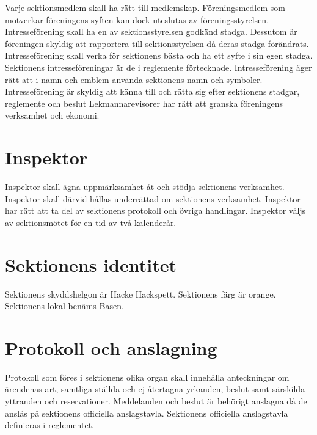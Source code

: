 \documentclass[a4paper]{dteklag}
\begin{document}
\para Varje sektionsmedlem skall ha rätt till medlemskap. Föreningsmedlem som motverkar föreningens syften kan dock uteslutas av föreningsstyrelsen.
\para Intresseförening skall ha en av sektionsstyrelsen godkänd stadga. Dessutom är föreningen skyldig att rapportera till sektionsstyelsen då deras stadga förändrats.
\para Intresseförening skall verka för sektionens bästa och ha ett syfte i sin egen stadga.
\para Sektionens intresseföreningar är de i reglemente förtecknade.
\para Intresseförening äger rätt att i namn och emblem använda sektionens namn och symboler.
\para Intresseförening är skyldig att känna till och rätta sig efter sektionens stadgar, reglemente och beslut
\para Lekmannarevisorer har rätt att granska föreningens verksamhet och ekonomi.

\section{Inspektor}
\para Inspektor skall ägna uppmärksamhet åt och stödja sektionens verksamhet.
\stycke Inspektor skall därvid hållas underrättad om sektionens verksamhet.
\para Inspektor har rätt att ta del av sektionens protokoll och övriga handlingar.
\para Inspektor väljs av sektionsmötet för en tid av två kalenderår.

\section{Sektionens identitet}
\para[Skyddshelgon] Sektionens skyddshelgon är Hacke Hackspett.
\para[Sektionsfärg] Sektionens färg är orange.
\para[Sektionslokal] Sektionens lokal benäms Basen.

\section{Protokoll och anslagning}
\para[Allmänt] Protokoll som föres i sektionens olika organ skall innehålla anteckningar om ärendenas art, samtliga ställda och ej återtagna yrkanden, beslut samt särskilda yttranden och reservationer.
\para[Anslagning] Meddelanden och beslut är behörigt anslagna då de anslås på sektionens officiella anslagstavla. Sektionens officiella anslagstavla definieras i reglementet.

\end{document}
